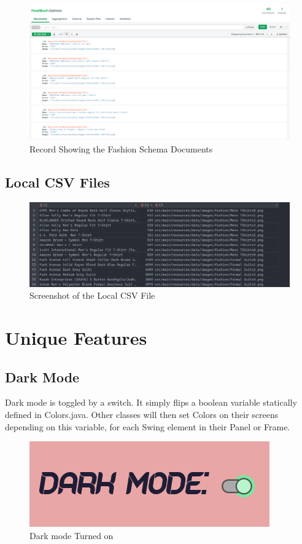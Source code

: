 \documentclass[11pt]{article}
\begin{document}
\begin{figure}[H]
	\centering
	\includegraphics[scale=0.4]{mongo 2.png}
	\caption{Record Showing the Fashion Schema Documents}
\end{figure}
\subsection{Local CSV Files}
\begin{figure}[H]
	\centering
	\includegraphics[scale=0.4]{csv.png}
	\caption{Screenshot of the Local CSV File}
\end{figure}
\section{Unique Features}
\subsection{Dark Mode}
Dark mode is toggled by a switch. It simply flips a boolean variable statically defined in Colors.java. Other classes will then set Colors on their screens depending on this variable, for each Swing element in their Panel or Frame. 
\begin{figure}[H]
\centering
\includegraphics[scale=0.5]{dark mode2.png}
\caption{Dark mode Turned on}
\end{figure}
\end{document}
